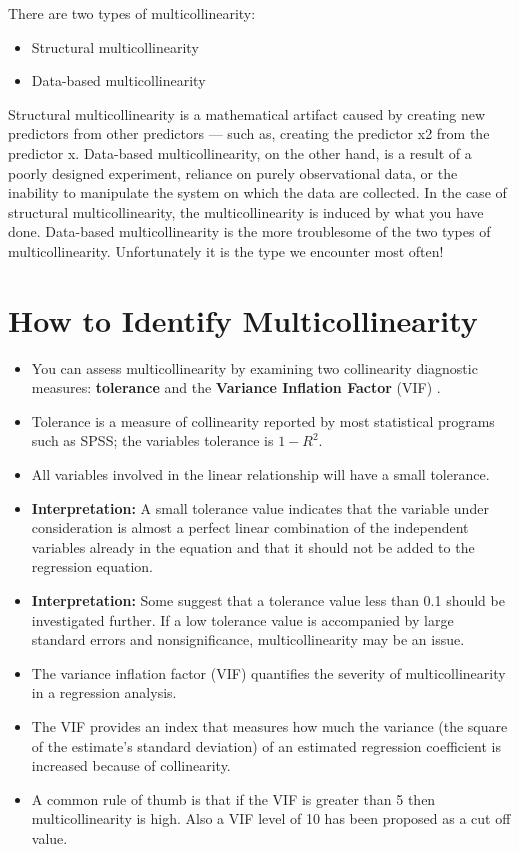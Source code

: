 \documentclass[a4paper,12pt]{article}
\begin{document}
	There are two types of multicollinearity: 
	\begin{itemize}
		\item Structural multicollinearity
		\item Data-based multicollinearity
	\end{itemize}
	Structural multicollinearity is a mathematical artifact caused by creating new predictors from other predictors — such as, creating the predictor x2 from the predictor x. 
	Data-based multicollinearity, on the other hand, is a result of a poorly designed experiment, reliance on purely observational data, or the inability to manipulate the system on which the data are collected. 
	In the case of structural multicollinearity, the multicollinearity is induced by what you have done. Data-based multicollinearity is the more troublesome of the two types of multicollinearity. Unfortunately it is the type we encounter most often!
	
	


\section{How to Identify Multicollinearity}

\begin{itemize}
	\item You can assess multicollinearity by examining two collinearity diagnostic  measures: \textbf{tolerance} and the \textbf{Variance Inflation Factor} (VIF) .
	\item Tolerance is a measure of collinearity reported by most statistical programs such as SPSS; the variables tolerance is $1-R^2$. 

	\item All variables involved in the linear relationship will have a small tolerance. 
	\item \textbf{Interpretation:} A small tolerance value indicates that the variable under consideration is almost a perfect linear combination of the independent variables already in the equation and that it should not be added to the regression equation. 
	\item \textbf{Interpretation:} Some suggest that a tolerance value less than 0.1 should be investigated further. If a low tolerance value is accompanied by large standard errors and nonsignificance, multicollinearity may be an issue.
		
		\item The variance inflation factor (VIF) quantifies the severity of multicollinearity in a regression analysis.
		
		\item The VIF provides an index that measures how much the variance (the square of the estimate's standard deviation) of an estimated regression coefficient is increased because of collinearity.
	\item	A common rule of thumb is that if the VIF is greater than 5 then multicollinearity is high. Also a VIF level of 10 has been proposed as a cut off value.	
\end{itemize}	
%	
		
\end{document}
